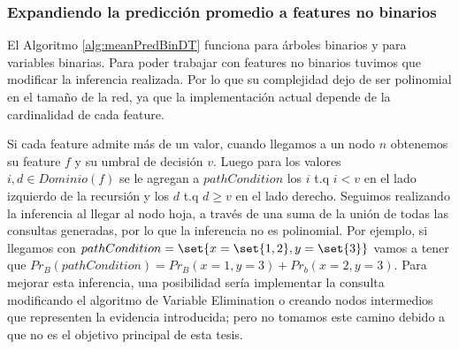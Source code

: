 \subsubsection{Expandiendo la predicción promedio a features no binarios} 


El Algoritmo \ref{alg:meanPredBinDT} funciona para árboles binarios y para variables binarias. Para poder trabajar con features no binarios tuvimos que modificar la inferencia realizada. Por lo que su complejidad dejo de ser polinomial en el tamaño de la red, ya que la implementación actual depende de la cardinalidad de cada feature.

Si cada feature admite más de un valor, cuando llegamos a un nodo $n$ obtenemos su feature $f$ y su umbral de decisión $v$. Luego para los valores $i,d \in Dominio(f)$ se le agregan a $pathCondition$ los $i$ t.q $i<v$ en el lado izquierdo de la recursión y los $d$ t.q $d \geq v$ en el lado derecho. Seguimos realizando la inferencia al llegar al nodo hoja, a través de una suma de la unión de todas las consultas generadas, por lo que la inferencia no es polinomial. Por ejemplo, si llegamos con $pathCondition = \set{x=\set{1,2},y=\set{3}}$ vamos a tener que $Pr_B(pathCondition) = Pr_B(x=1,y=3) + Pr_b(x=2,y=3)$. Para mejorar esta inferencia, una posibilidad sería implementar la consulta modificando el algoritmo de Variable Elimination o creando nodos intermedios que representen la evidencia introducida; pero no tomamos este camino debido a que no es el objetivo principal de esta tesis. 


